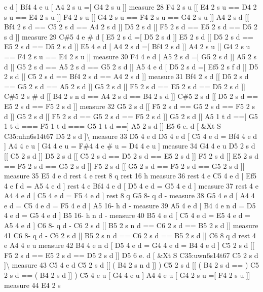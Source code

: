 e d \mbox{]} Bf4 4 e u \mbox{[} A4 2 s u =\mbox{[} G4 2 s u \mbox{]}\mbox{]} measure 28 F4 2 s u \mbox{[}\mbox{[} E4 2 s u == D4 2 s u == E4 2 s u \mbox{]}\mbox{]} F4 2 s u \mbox{[}\mbox{[} G4 2 s u == F4 2 s u == G4 2 s u \mbox{]}\mbox{]} A4 2 s d \mbox{[}\mbox{[} Bf4 2 s d == C5 2 s d == A4 2 s d \mbox{]}\mbox{]} D5 2 s d \mbox{[}\mbox{[} F5 2 s d == E5 2 s d == D5 2 s d \mbox{]}\mbox{]} measure 29 C\#5 4 e \# d \mbox{[} E5 2 s d =\mbox{[} D5 2 s d \mbox{]}\mbox{]} E5 2 s d \mbox{[}\mbox{[} D5 2 s d == E5 2 s d == D5 2 s d \mbox{]}\mbox{]} E5 4 e d \mbox{[} A4 2 s d =\mbox{[} Bf4 2 s d \mbox{]}\mbox{]} A4 2 s u \mbox{[}\mbox{[} G4 2 s u == F4 2 s u == E4 2 s u \mbox{]}\mbox{]} measure 30 F4 4 e d \mbox{[} A5 2 s d =\mbox{[} G5 2 s d \mbox{]}\mbox{]} A5 2 s d \mbox{[}\mbox{[} G5 2 s d == A5 2 s d == G5 2 s d \mbox{]}\mbox{]} A5 4 e d \mbox{[} D5 2 s d =\mbox{[} Ef5 2 s f d \mbox{]}\mbox{]} D5 2 s d \mbox{[}\mbox{[} C5 2 s d == Bf4 2 s d == A4 2 s d \mbox{]}\mbox{]} measure 31 Bf4 2 s d \mbox{[}\mbox{[} D5 2 s d == G5 2 s d == A5 2 s d \mbox{]}\mbox{]} G5 2 s d \mbox{[}\mbox{[} F5 2 s d == E5 2 s d == D5 2 s d \mbox{]}\mbox{]} C\#5 2 s \# d \mbox{[}\mbox{[} B4 2 s n d == A4 2 s d == B4 2 s d \mbox{]}\mbox{]} C\#5 2 s d \mbox{[}\mbox{[} D5 2 s d == E5 2 s d == F5 2 s d \mbox{]}\mbox{]} measure 32 G5 2 s d \mbox{[}\mbox{[} F5 2 s d == G5 2 s d == F5 2 s d \mbox{]}\mbox{]} G5 2 s d \mbox{[}\mbox{[} F5 2 s d == G5 2 s d == F5 2 s d \mbox{]}\mbox{]} G5 2 s d \mbox{[}\mbox{[} A5 1 t d ==\mbox{[} G5 1 t d === F5 1 t d === G5 1 t d ==\mbox{]} A5 2 s d \mbox{]}\mbox{]} E5 6 e. d \mbox{[} \&Xt S C35\+:uhn6s14t67 D5 2 s d \mbox{]}\textbackslash{} measure 33 D5 4 e d D5 4 e d \mbox{[} C5 4 e d = Bf4 4 e d \mbox{]} A4 4 e u \mbox{[} G4 4 e u = F\#4 4 e \# u = D4 4 e u \mbox{]} measure 34 G4 4 e u D5 2 s d \mbox{[}\mbox{[} C5 2 s d \mbox{]}\mbox{]} D5 2 s d \mbox{[}\mbox{[} C5 2 s d == D5 2 s d == E5 2 s d \mbox{]}\mbox{]} F5 2 s d \mbox{[}\mbox{[} E5 2 s d == F5 2 s d == G5 2 s d \mbox{]}\mbox{]} F5 2 s d \mbox{[}\mbox{[} G5 2 s d == F5 2 s d == G5 2 s d \mbox{]}\mbox{]} measure 35 E5 4 e d rest 4 e rest 8 q rest 16 h measure 36 rest 4 e C5 4 e d \mbox{[} Ef5 4 e f d = A5 4 e d \mbox{]} rest 4 e Bf4 4 e d \mbox{[} D5 4 e d = G5 4 e d \mbox{]} measure 37 rest 4 e A4 4 e d \mbox{[} C5 4 e d = F5 4 e d \mbox{]} rest 8 q G5 8-\/ q d -\/ measure 38 G5 4 e d \mbox{[} A4 4 e d = C5 4 e d = F5 4 e d \mbox{]} A5 16-\/ h d -\/ measure 39 A5 4 e d \mbox{[} B4 4 e n d = D5 4 e d = G5 4 e d \mbox{]} B5 16-\/ h n d -\/ measure 40 B5 4 e d \mbox{[} C5 4 e d = E5 4 e d = A5 4 e d \mbox{]} C6 8-\/ q d -\/ C6 2 s d \mbox{[}\mbox{[} B5 2 s n d == C6 2 s d == B5 2 s d \mbox{]}\mbox{]} measure 41 C6 8-\/ q d -\/ C6 2 s d \mbox{[}\mbox{[} B5 2 s n d == C6 2 s d == B5 2 s d \mbox{]}\mbox{]} C6 8 q d rest 4 e A4 4 e u measure 42 B4 4 e n d \mbox{[} D5 4 e d = G4 4 e d = B4 4 e d \mbox{]} C5 2 s d \mbox{[}\mbox{[} F5 2 s d == E5 2 s d == D5 2 s d \mbox{]}\mbox{]} D5 6 e. d \mbox{[} \&Xt S C35\+:uwn6s14t67 C5 2 s d \mbox{]}\textbackslash{} measure 43 C5 4 e d C5 2 s d \mbox{[}\mbox{[} ( B4 2 s n d \mbox{]}\mbox{]} ) C5 2 s d \mbox{[}\mbox{[} ( B4 2 s d == ) C5 2 s d == ( B4 2 s d \mbox{]}\mbox{]} ) C5 4 e u \mbox{[} G4 4 e u \mbox{]} A4 4 e u \mbox{[} G4 2 s u =\mbox{[} F4 2 s u \mbox{]}\mbox{]} measure 44 E4 2 s 